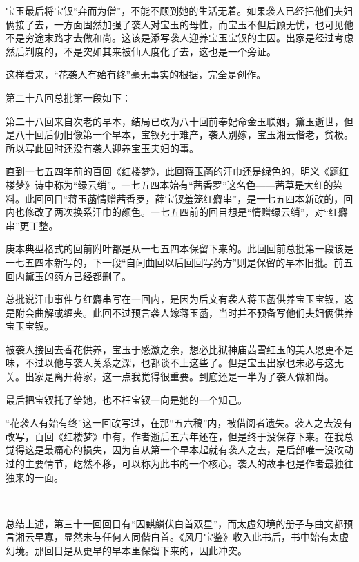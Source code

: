 \par 宝玉最后将宝钗“弃而为僧”，不能不顾到她的生活无着。如果袭人已经把他们夫妇俩接了去，一方面固然加强了袭人对宝玉的母性，而宝玉不但后顾无忧，也可见他不是穷途末路才去做和尚。这该是添写袭人迎养宝玉宝钗的主因。出家是经过考虑然后剃度的，不是突如其来被仙人度化了去，这也是一个旁证。
\par 这样看来，“花袭人有始有终”毫无事实的根据，完全是创作。
\par 第二十八回总批第一段如下：
\par 第二十八回来自次老的早本，结局已改为八十回前奉妃命金玉联姻，黛玉逝世，但是八十回后仍旧像第一个早本，宝钗死于难产，袭人别嫁，宝玉湘云偕老，贫极。所以写此回时还没有袭人迎养宝玉夫妇的事。
\par 直到一七五四年前的百回《红楼梦》，此回蒋玉菡的汗巾还是绿色的，明义《题红楼梦》诗中称为“绿云绡”。一七五四本始有“茜香罗”这名色——茜草是大红的染料。此回回目“蒋玉菡情赠茜香罗，薛宝钗羞笼红麝串”，是一七五四本新改的，回内也修改了两次换系汗巾的颜色。一七五四前的回目想是“情赠绿云绡”，对“红麝串”更工整。
\par 庚本典型格式的回前附叶都是从一七五四本保留下来的。此回回前总批第一段该是一七五四本新写的，下一段“自闻曲回以后回回写药方”则是保留的早本旧批。前五回内黛玉的药方已经都删了。
\par 总批说汗巾事件与红麝串写在一回内，是因为后文有袭人蒋玉菡供养宝玉宝钗，这是附会曲解或缠夹。此回不过预言袭人嫁蒋玉菡，当时并不预备写他们夫妇俩供养宝玉宝钗。
\par 被袭人接回去香花供养，宝玉于感激之余，想必比狱神庙茜雪红玉的美人恩更不是味，不过以他与袭人关系之深，也都谈不上这些了。但是宝玉出家也未必与这无关。出家是离开蒋家，这一点我觉得很重要。到底还是一半为了袭人做和尚。
\par 最后把宝钗托了给她，也不枉宝钗一向是她的一个知己。
\par “花袭人有始有终”这一回改写过，在那“五六稿”内，被借阅者遗失。袭人之去没有改写，百回《红楼梦》中有，作者逝后五六年还在，但是终于没保存下来。在我总觉得这是最痛心的损失，因为自从第一个早本起就有袭人之去，是后部唯一没改动过的主要情节，屹然不移，可以称为此书的一个核心。袭人的故事也是作者最独往独来的一面。
\par  
\par 总结上述，第三十一回回目有“因麒麟伏白首双星”，而太虚幻境的册子与曲文都预言湘云早寡，显然未与任何人同偕白首。《风月宝鉴》收入此书后，书中始有太虚幻境。那回目是从更早的早本里保留下来的，因此冲突。

